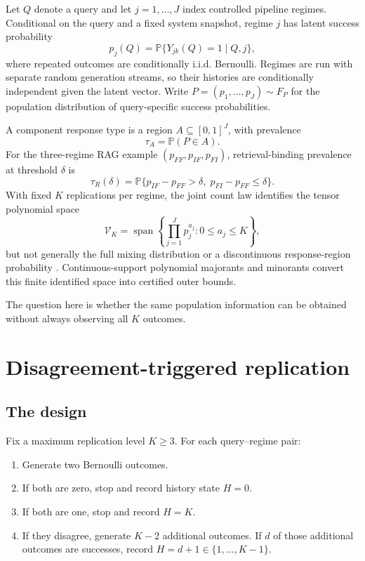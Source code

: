 \documentclass[11pt]{article}
\theoremstyle{remark}
\newcommand{\Pp}{\mathbb{P}}
\newcommand{\calV}{\mathcal{V}}
\newcommand{\tauR}{\tau_R}
\begin{document}
Let $Q$ denote a query and let $j=1,\ldots,J$ index controlled pipeline regimes. Conditional on the query and a fixed system snapshot, regime $j$ has latent success probability
\[
 p_j(Q)=\Pp\{Y_{jk}(Q)=1\mid Q,j\},
\]
where repeated outcomes are conditionally i.i.d. Bernoulli. Regimes are run with separate random generation streams, so their histories are conditionally independent given the latent vector. Write $P=(p_1,\ldots,p_J)\sim F_P$ for the population distribution of query-specific success probabilities.

A component response type is a region $A\subseteq[0,1]^J$, with prevalence
\[
 \tau_A = \Pp(P\in A).
\]
For the three-regime RAG example $(p_{FF},p_{IF},p_{FI})$, retrieval-binding prevalence at threshold $\delta$ is
\[
 \tauR(\delta)=\Pp\{p_{IF}-p_{FF}>\delta,\;p_{FI}-p_{FF}\le\delta\}.
\]
With fixed $K$ replications per regime, the joint count law identifies the tensor polynomial space
\[
 \calV_K = \operatorname{span}\left\{\prod_{j=1}^Jp_j^{a_j}:0\le a_j\le K\right\},
\]
but not generally the full mixing distribution or a discontinuous response-region probability \citep{Hait2026Partial}. Continuous-support polynomial majorants and minorants convert this finite identified space into certified outer bounds.

The question here is whether the same population information can be obtained without always observing all $K$ outcomes.

\section{Disagreement-triggered replication}

\subsection{The design}

Fix a maximum replication level $K\ge3$. For each query--regime pair:
\begin{enumerate}[leftmargin=*]
\item Generate two Bernoulli outcomes.
\item If both are zero, stop and record history state $H=0$.
\item If both are one, stop and record $H=K$.
\item If they disagree, generate $K-2$ additional outcomes. If $d$ of those additional outcomes are successes, record $H=d+1\in\{1,\ldots,K-1\}$.
\end{enumerate}
\end{document}
